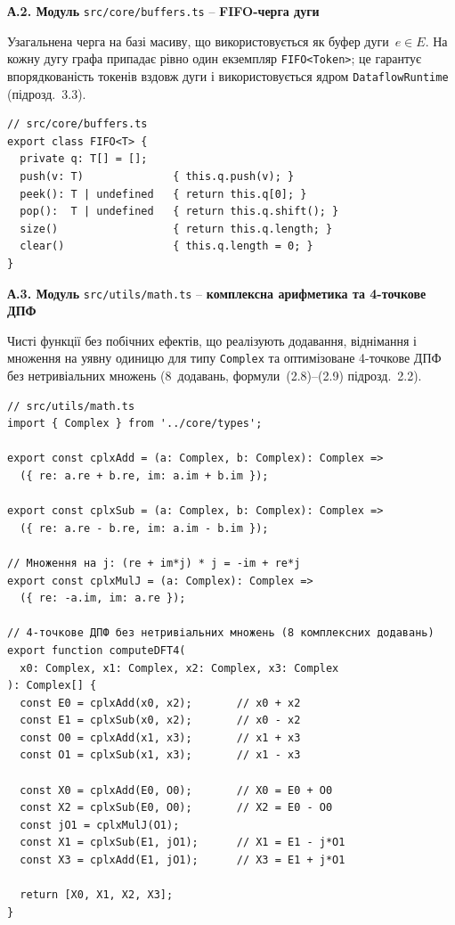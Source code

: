 \documentclass[
]{article}
\begin{document}
\textbf{А.2. Модуль} \texttt{src/core/buffers.ts} -- \textbf{FIFO-черга
дуги}

Узагальнена черга на базі масиву, що використовується як буфер
дуги~\(e \in E\). На кожну дугу графа припадає рівно один екземпляр
\texttt{FIFO\textless{}Token\textgreater{}}; це гарантує
впорядкованість токенів вздовж дуги і використовується ядром
\texttt{DataflowRuntime} (підрозд.~3.3).

\begin{verbatim}
// src/core/buffers.ts
export class FIFO<T> {
  private q: T[] = [];
  push(v: T)              { this.q.push(v); }
  peek(): T | undefined   { return this.q[0]; }
  pop():  T | undefined   { return this.q.shift(); }
  size()                  { return this.q.length; }
  clear()                 { this.q.length = 0; }
}
\end{verbatim}

\textbf{А.3. Модуль} \texttt{src/utils/math.ts} -- \textbf{комплексна
арифметика та 4-точкове ДПФ}

Чисті функції без побічних ефектів, що реалізують додавання, віднімання
і множення на уявну одиницю для типу \texttt{Complex} та оптимізоване
4-точкове ДПФ без нетривіальних множень (8~додавань, формули~(2.8)--(2.9)
підрозд.~2.2).

\begin{verbatim}
// src/utils/math.ts
import { Complex } from '../core/types';

export const cplxAdd = (a: Complex, b: Complex): Complex =>
  ({ re: a.re + b.re, im: a.im + b.im });

export const cplxSub = (a: Complex, b: Complex): Complex =>
  ({ re: a.re - b.re, im: a.im - b.im });

// Множення на j: (re + im*j) * j = -im + re*j
export const cplxMulJ = (a: Complex): Complex =>
  ({ re: -a.im, im: a.re });

// 4-точкове ДПФ без нетривіальних множень (8 комплексних додавань)
export function computeDFT4(
  x0: Complex, x1: Complex, x2: Complex, x3: Complex
): Complex[] {
  const E0 = cplxAdd(x0, x2);       // x0 + x2
  const E1 = cplxSub(x0, x2);       // x0 - x2
  const O0 = cplxAdd(x1, x3);       // x1 + x3
  const O1 = cplxSub(x1, x3);       // x1 - x3

  const X0 = cplxAdd(E0, O0);       // X0 = E0 + O0
  const X2 = cplxSub(E0, O0);       // X2 = E0 - O0
  const jO1 = cplxMulJ(O1);
  const X1 = cplxSub(E1, jO1);      // X1 = E1 - j*O1
  const X3 = cplxAdd(E1, jO1);      // X3 = E1 + j*O1

  return [X0, X1, X2, X3];
}
\end{verbatim}
\end{document}
